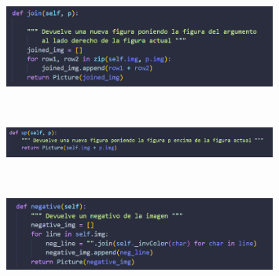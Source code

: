 \documentclass{article}
\begin{document}
    \begin{figure}[H]
		          \centering
		          \includegraphics[width=0.8\textwidth,keepaspectratio]                       {img/picJoin.png}
    \end{figure}
\\
    \begin{figure}[H]
		          \centering
		          \includegraphics[width=0.8\textwidth,keepaspectratio]                       {img/picUp.png}
    \end{figure}

\\    
 \begin{figure}[H]
		          \centering
		          \includegraphics[width=0.8\textwidth,keepaspectratio]                       {img/picNeg.png}
    \end{figure}
\end{document}
